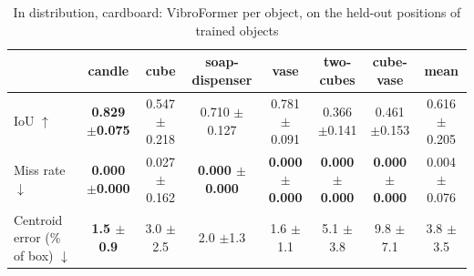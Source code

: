 \begin{table}
\caption{In distribution, cardboard: VibroFormer per object, on the held-out positions of trained objects}
\label{tab:id_cardboard}
\begin{tabular}{l!{\vrule width 1.2pt}cccccc!{\vrule width 1.2pt}c}
\toprule
 & candle & cube & soap-dispenser & vase & two-cubes & cube-vase & mean \\
\midrule
IoU $\uparrow$ & \bfseries 0.829 {\scriptsize $\pm$0.075} & 0.547 {\scriptsize $\pm$0.218} & 0.710 {\scriptsize $\pm$0.127} & 0.781 {\scriptsize $\pm$0.091} & 0.366 {\scriptsize $\pm$0.141} & 0.461 {\scriptsize $\pm$0.153} & 0.616 {\scriptsize $\pm$0.205} \\
Miss rate $\downarrow$ & \bfseries 0.000 {\scriptsize $\pm$0.000} & 0.027 {\scriptsize $\pm$0.162} & \bfseries 0.000 {\scriptsize $\pm$0.000} & \bfseries 0.000 {\scriptsize $\pm$0.000} & \bfseries 0.000 {\scriptsize $\pm$0.000} & \bfseries 0.000 {\scriptsize $\pm$0.000} & 0.004 {\scriptsize $\pm$0.076} \\
Centroid error (\% of box) $\downarrow$ & \bfseries 1.5 {\scriptsize $\pm$0.9} & 3.0 {\scriptsize $\pm$2.5} & 2.0 {\scriptsize $\pm$1.3} & 1.6 {\scriptsize $\pm$1.1} & 5.1 {\scriptsize $\pm$3.8} & 9.8 {\scriptsize $\pm$7.1} & 3.8 {\scriptsize $\pm$3.5} \\
\bottomrule
\end{tabular}
\end{table}
